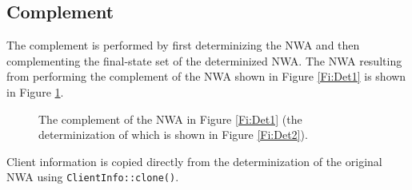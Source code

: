 


\subsection{Complement}
\label{Se:Complement}

The complement is performed by first determinizing the NWA and then
complementing the final-state set of the determinized NWA.  The NWA resulting
from performing the complement of the NWA shown in Figure \ref{Fi:Det1} is
shown in Figure \ref{Fi:Comp1}.

\begin{figure}[p]
  \centering
  \caption{The complement of the NWA in Figure \ref{Fi:Det1} (the
    determinization of which is shown in Figure \ref{Fi:Det2}).}
  \label{Fi:Comp1}
\end{figure}

Client information is copied directly
from the determinization of the original NWA using \texttt{ClientInfo::clone()}.


